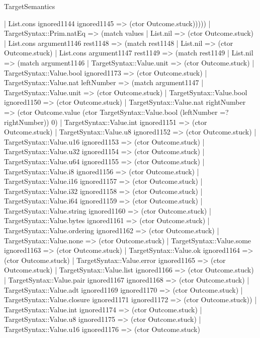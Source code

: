 \begin{lexlean}{TargetSemantics}
\begin{semanticmodule}
{            | List.cons ignored1144 ignored1145 => (ctor Outcome.stuck)))))
    | TargetSyntax::Prim.natEq => (match values
      | List.nil => (ctor Outcome.stuck)
      | List.cons argument1146 rest1148 => (match rest1148
        | List.nil => (ctor Outcome.stuck)
        | List.cons argument1147 rest1149 => (match rest1149
          | List.nil => (match argument1146
            | TargetSyntax::Value.unit => (ctor Outcome.stuck)
            | TargetSyntax::Value.bool ignored1173 => (ctor Outcome.stuck)
            | TargetSyntax::Value.nat leftNumber => (match argument1147
              | TargetSyntax::Value.unit => (ctor Outcome.stuck)
              | TargetSyntax::Value.bool ignored1150 => (ctor Outcome.stuck)
              | TargetSyntax::Value.nat rightNumber => (ctor Outcome.value (ctor TargetSyntax::Value.bool (leftNumber =? rightNumber)) 0)
              | TargetSyntax::Value.int ignored1151 => (ctor Outcome.stuck)
              | TargetSyntax::Value.u8 ignored1152 => (ctor Outcome.stuck)
              | TargetSyntax::Value.u16 ignored1153 => (ctor Outcome.stuck)
              | TargetSyntax::Value.u32 ignored1154 => (ctor Outcome.stuck)
              | TargetSyntax::Value.u64 ignored1155 => (ctor Outcome.stuck)
              | TargetSyntax::Value.i8 ignored1156 => (ctor Outcome.stuck)
              | TargetSyntax::Value.i16 ignored1157 => (ctor Outcome.stuck)
              | TargetSyntax::Value.i32 ignored1158 => (ctor Outcome.stuck)
              | TargetSyntax::Value.i64 ignored1159 => (ctor Outcome.stuck)
              | TargetSyntax::Value.string ignored1160 => (ctor Outcome.stuck)
              | TargetSyntax::Value.bytes ignored1161 => (ctor Outcome.stuck)
              | TargetSyntax::Value.ordering ignored1162 => (ctor Outcome.stuck)
              | TargetSyntax::Value.none => (ctor Outcome.stuck)
              | TargetSyntax::Value.some ignored1163 => (ctor Outcome.stuck)
              | TargetSyntax::Value.ok ignored1164 => (ctor Outcome.stuck)
              | TargetSyntax::Value.error ignored1165 => (ctor Outcome.stuck)
              | TargetSyntax::Value.list ignored1166 => (ctor Outcome.stuck)
              | TargetSyntax::Value.pair ignored1167 ignored1168 => (ctor Outcome.stuck)
              | TargetSyntax::Value.adt ignored1169 ignored1170 => (ctor Outcome.stuck)
              | TargetSyntax::Value.closure ignored1171 ignored1172 => (ctor Outcome.stuck))
            | TargetSyntax::Value.int ignored1174 => (ctor Outcome.stuck)
            | TargetSyntax::Value.u8 ignored1175 => (ctor Outcome.stuck)
            | TargetSyntax::Value.u16 ignored1176 => (ctor Outcome.stuck)
}
\end{semanticmodule}
\end{lexlean}
